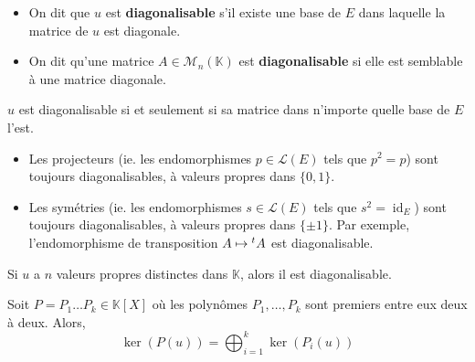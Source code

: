   \begin{definition}
    \begin{itemize}
      \item On dit que $u$ est \textbf{diagonalisable} s'il existe une base de $E$ dans laquelle la matrice de $u$ est diagonale.
      \item On dit qu'une matrice $A \in \mathcal{M}_n(\mathbb{K})$ est \textbf{diagonalisable} si elle est semblable à une matrice diagonale.
    \end{itemize}
  \end{definition}

  \begin{remark}
    $u$ est diagonalisable si et seulement si sa matrice dans n'importe quelle base de $E$ l'est.
  \end{remark}


  \begin{example}
    \begin{itemize}
      \item Les projecteurs (ie. les endomorphismes $p \in \mathcal{L}(E)$ tels que $p^2 = p$) sont toujours diagonalisables, à valeurs propres dans $\{ 0, 1 \}$.
      \item Les symétries (ie. les endomorphismes $s \in \mathcal{L}(E)$ tels que $s^2 = \operatorname{id}_E$) sont toujours diagonalisables, à valeurs propres dans $\{ \pm 1 \}$. Par exemple, l'endomorphisme de transposition $A \mapsto \mathstrut ^t A$ est diagonalisable.
    \end{itemize}
  \end{example}


  \begin{proposition}
    Si $u$ a $n$ valeurs propres distinctes dans $\mathbb{K}$, alors il est diagonalisable.
  \end{proposition}


  \begin{theorem}
    Soit $P = P_1 \dots P_k \in \mathbb{K}[X]$ où les polynômes $P_1, \dots, P_k$ sont premiers entre eux deux à deux. Alors,
    \[ \ker(P(u)) = \bigoplus_{i=1}^k \ker(P_i(u)) \]
  \end{theorem}


